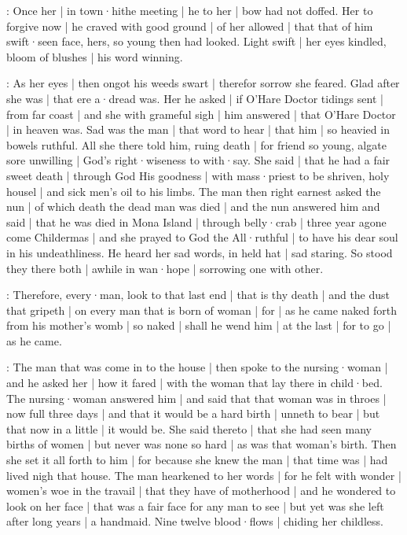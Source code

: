 \begin{omitted}

:
Once her |
in town·hithe meeting |
he to her |
bow had not doffed.
Her to forgive now |
he craved with good ground |
of her allowed |
that that of him swift·seen face,
hers,
so young then had looked.
Light swift |
her eyes kindled,
bloom of blushes |
his word winning.


:
As her eyes |
then ongot his weeds swart |
therefor sorrow she feared.
Glad after she was |
that ere a·dread was.
Her he asked |
if O'Hare Doctor tidings sent |
from far coast |
and she with grameful sigh |
him answered |
that O'Hare Doctor |
in heaven was.
Sad was the man |
that word to hear |
that him |
so heavied in bowels ruthful.
All she there told him,
ruing death |
for friend so young,
algate sore unwilling |
God's right·wiseness to with·say.
She said |
that he had a fair sweet death |
through God His goodness |
with mass·priest to be shriven,
holy housel |
and sick men's oil to his limbs.
The man then right earnest asked the nun |
of which death the dead man was died |
and the nun answered him and said |
that he was died in Mona Island |
through belly·crab |
three year agone come Childermas |
and she prayed to God the All·ruthful |
to have his dear soul in his undeathliness.
He heard her sad words,
in held hat |
sad staring.
So stood they there both |
awhile in wan·hope |
sorrowing one with other.

\end{omitted}


\begin{omitted}
:
Therefore,
every·man,
look to that last end |
that is thy death |
and the dust that gripeth |
on every man that is born of woman |
for |
as he came naked forth from his mother's womb |
so naked |
shall he wend him |
at the last |
for to go |
as he came.%
\end{omitted}


:
The man that was come in to the house |
then spoke to the nursing·woman |
and he asked her |
how it fared |
with the woman that lay there in child·bed.
The nursing·woman answered him |
and said that that woman was in throes |
now full three days |
and that it would be a hard birth |
unneth to bear |
but that now in a little |
it would be.
She said thereto |
that she had seen many births of women |
but never was none so hard |
as was that woman's birth.
Then she set it all forth to him |
for because she knew the man |
that time was |
had lived nigh that house.
The man hearkened to her words |
for he felt with wonder |
women's woe in the travail |
that they have of motherhood |
and he wondered to look on her face |
that was a fair face for any man to see |
but yet was she left after long years |
a handmaid.
Nine twelve blood·flows |
chiding her childless.

